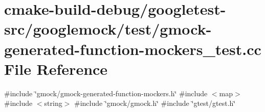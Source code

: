 \hypertarget{gmock-generated-function-mockers__test_8cc}{}\section{cmake-\/build-\/debug/googletest-\/src/googlemock/test/gmock-\/generated-\/function-\/mockers\+\_\+test.cc File Reference}
\label{gmock-generated-function-mockers__test_8cc}
{\ttfamily \#include \char`\"{}gmock/gmock-\/generated-\/function-\/mockers.\+h\char`\"{}}\newline
{\ttfamily \#include $<$map$>$}\newline
{\ttfamily \#include $<$string$>$}\newline
{\ttfamily \#include \char`\"{}gmock/gmock.\+h\char`\"{}}\newline
{\ttfamily \#include \char`\"{}gtest/gtest.\+h\char`\"{}}\newline
